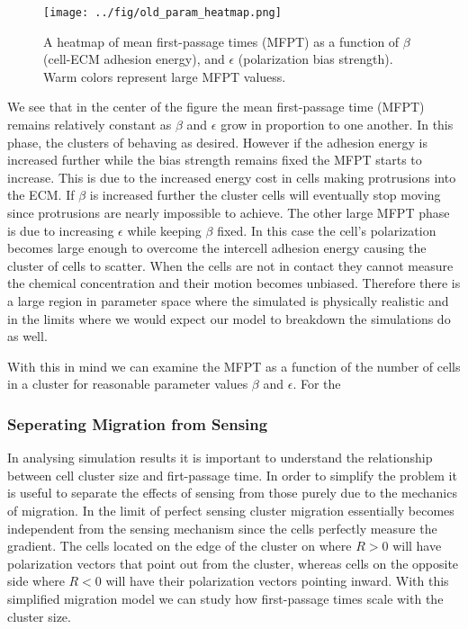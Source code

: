 \documentclass[a4paper]{article}
\begin{document}
\begin{figure}
    \centering
        \texttt{[image: ../fig/old\_param\_heatmap.png]}
    \caption{A heatmap of mean first-passage times (MFPT) as a function of $\beta$ (cell-ECM adhesion energy), and $\epsilon$ (polarization bias strength). Warm colors represent large MFPT valuess.} \label{fig:heatmap}
\end{figure}

We see that in the center of the figure the mean first-passage time (MFPT) remains relatively constant as $\beta$ and $\epsilon$ grow in proportion to one another. In this phase, the clusters of behaving as desired. However if the adhesion energy is increased further while the bias strength remains fixed the MFPT starts to increase. This is due to the increased energy cost in cells making protrusions into the ECM. If $\beta$ is increased further the cluster cells will eventually stop moving since protrusions are nearly impossible to achieve. The other large MFPT phase is due to increasing $\epsilon$ while keeping $\beta$ fixed. In this case the cell's polarization becomes large enough to overcome the intercell adhesion energy causing the cluster of cells to scatter. When the cells are not in contact they cannot measure the chemical concentration and their motion becomes unbiased. Therefore there is a large region in parameter space where the simulated is physically realistic and in the limits where we would expect our model to breakdown the simulations do as well.

With this in mind we can examine the MFPT as a function of the number of cells in a cluster for reasonable parameter values $\beta$ and $\epsilon$. For the

\subsubsection{Seperating Migration from Sensing}

In analysing simulation results it is important to understand the relationship between cell cluster size and firt-passage time. In order to simplify the problem it is useful to separate the effects of sensing from those purely due to the mechanics of migration. In the limit of perfect sensing cluster migration essentially becomes independent from the sensing mechanism since the cells perfectly measure the gradient. The cells located on the edge of the cluster on where $R>0$ will have polarization vectors that point out from the cluster, whereas cells on the opposite side where $R<0$ will have their polarization vectors pointing inward. With this simplified migration model we can study how first-passage times scale with the cluster size.
\end{document}
